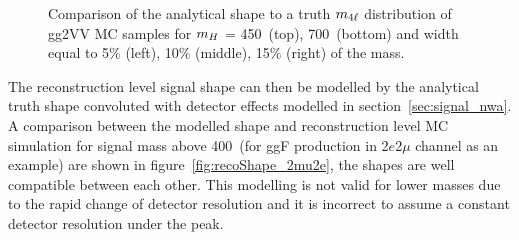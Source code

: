 \begin{figure}[!htbp]
    \caption{Comparison of the analytical shape to a truth $m_{4\ell}$ distribution of gg2VV MC samples for $m_{H}$ = 450~\gev (top), 700~\gev (bottom) 
    and width equal to 5$\%$ (left), 10$\%$ (middle), 15$\%$ (right) of the mass.}
    \label{fig:truthShape}
\end{figure}

The reconstruction level signal shape can then be modelled by the analytical truth shape convoluted with detector effects modelled in section~\ref{sec:signal_nwa}.
A comparison between the modelled shape and reconstruction level MC simulation for signal mass above 400~\gev (for ggF production in 2$e$2$\mu$ channel as an example) are shown in figure~\ref{fig:recoShape_2mu2e}, 
the shapes are well compatible between each other.
This modelling is not valid for lower masses due to the rapid change of detector resolution and it is incorrect to assume a constant detector resolution under the peak.

